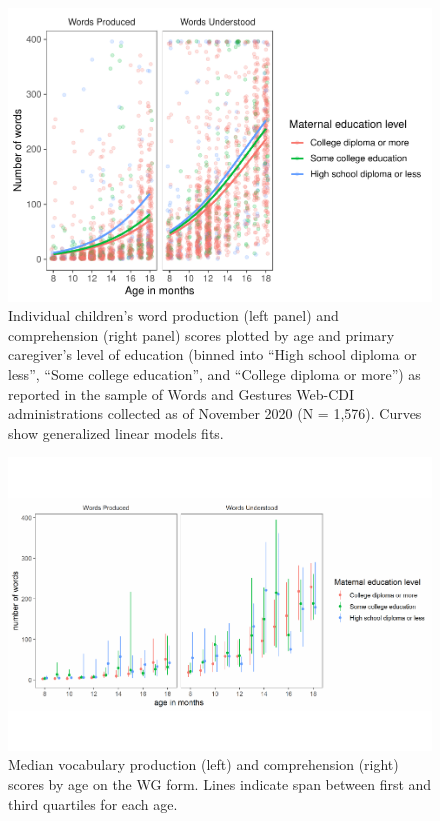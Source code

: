 \documentclass[
  english,
  man]{apa7}
\begin{document}
\begin{figure}
\centering
\includegraphics{webcdi_paper_files/figure-latex/wgglm-1.pdf}
\caption{\label{fig:wgglm} Individual children's word production (left panel) and comprehension (right panel) scores plotted by age and primary caregiver's level of education (binned into \enquote{High school diploma or less}, \enquote{Some college education}, and \enquote{College diploma or more}) as reported in the sample of Words and Gestures Web-CDI administrations collected as of November 2020 (N = 1,576). Curves show generalized linear models fits.}
\end{figure}

\begin{figure}
\centering
\includegraphics{webcdi_paper_files/figure-latex/wgmedfig-1.pdf}
\caption{\label{fig:wgmedfig}Median vocabulary production (left) and comprehension (right) scores by age on the WG form. Lines indicate span between first and third quartiles for each age.}
\end{figure}
\end{document}
